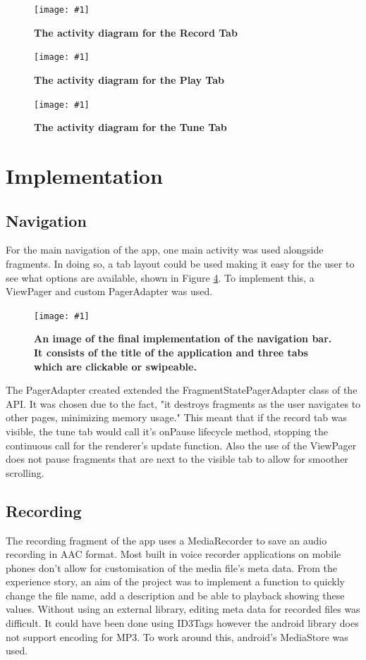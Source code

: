 \documentclass[conference]{acmsiggraph}
\newcommand{\figuremacroF}[3]{
	\begin{figure}[H] %
		\centering
		\texttt{[image: \#1]}
		\caption[#2]{\textbf{#2}}
		\label{fig:#1}
	\end{figure}
}
\begin{document}
\figuremacroF
{RecordTab}
{The activity diagram for the Record Tab}
{1.0}

\figuremacroF
{PlayTab}
{The activity diagram for the Play Tab}
{1.0}

\figuremacroF
{TuneTab}
{The activity diagram for the Tune Tab}
{1.0}
 
\section{Implementation}

\subsection{Navigation}

For the main navigation of the app, one main activity was used alongside fragments. In doing so, a tab layout could be used making it easy for the user to see what options are available, shown in Figure \ref{fig:navBar}. To implement this, a ViewPager and custom PagerAdapter was used.

\figuremacroF
{navBar}
{An image of the final implementation of the navigation bar. It consists of the title of the application and three tabs which are clickable or swipeable.}
{1.0}

The PagerAdapter created extended the FragmentStatePagerAdapter class of the API. It was chosen due to the fact, "it destroys fragments as the user navigates to other pages, minimizing memory usage." \cite{Swipe} This meant that if the record tab was visible, the tune tab would call it's onPause lifecycle method, stopping the continuous call for the renderer's update function. Also the use of the ViewPager does not pause fragments that are next to the visible tab to allow for smoother scrolling.


\subsection{Recording}

The recording fragment of the app uses a MediaRecorder to save an audio recording in AAC format. Most built in voice recorder applications on mobile phones don't allow for customisation of the media file's meta data. From the experience story, an aim of the project was to implement a function to quickly change the file name, add a description and be able to playback showing these values. Without using an external library, editing meta data for recorded files was difficult. It could have been done using ID3Tags however the android library does not support encoding for MP3. \cite{SupportedMedia} To work around this, android's MediaStore was used.
\end{document}
